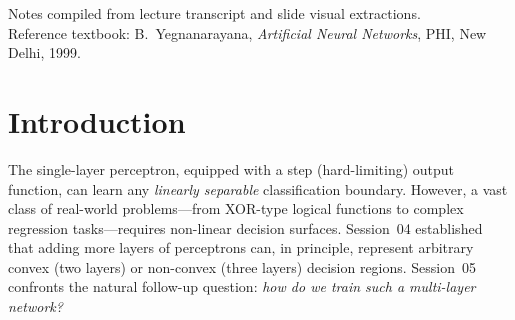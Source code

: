 \documentclass[12pt,a4paper]{article}
\newcommand{\Loss}{\mathcal{L}}
\begin{document}
\begin{titlepage}
  \begin{abstract}
    \noindent
    Session~05 extends the single-layer perceptron framework to
    \emph{multi-layer feedforward neural networks} (MLFFNNs).  The session
    opens with a recap of why linearly non-separable problems require hidden
    layers, then identifies the \emph{hard learning problem}: the perceptron
    learning rule cannot be applied to hidden-layer weights because no target
    output is available there.  The resolution is replacing the
    non-differentiable step function with \emph{differentiable sigmoidal
    activations} (logistic and hyperbolic tangent), enabling the
    \emph{backpropagation algorithm} (generalised delta rule) to propagate
    error gradients from the output layer back through every hidden layer via
    the chain rule.  A complete numerical forward pass on an IQ/CGPA
    prediction example (ReLU hidden activations, linear output) is worked
    through, followed by the derivation of the first backpropagation
    gradients $\partial\Loss/\partial v_1$, $\partial\Loss/\partial v_2$, and
    $\partial\Loss/\partial b_3$.
  \end{abstract}

  \vfill
  {\small Notes compiled from lecture transcript and slide visual extractions.\\
   Reference textbook: B.~Yegnanarayana, \emph{Artificial Neural Networks},
   PHI, New Delhi, 1999.}
\end{titlepage}


\newpage

\section{Introduction}
\label{sec:intro}

The single-layer perceptron, equipped with a step (hard-limiting) output
function, can learn any \emph{linearly separable} classification boundary.
However, a vast class of real-world problems---from XOR-type logical functions
to complex regression tasks---requires non-linear decision surfaces.
Session~04 established that adding more layers of perceptrons can, in
principle, represent arbitrary convex (two layers) or non-convex (three
layers) decision regions.  Session~05 confronts the natural follow-up
question: \emph{how do we train such a multi-layer network?}
\end{document}
